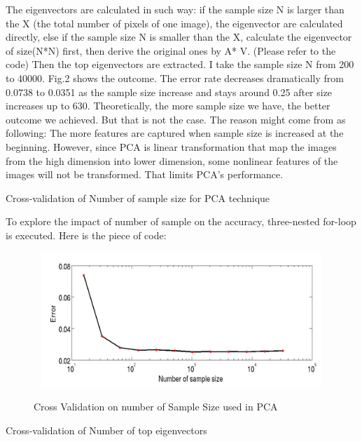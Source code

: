 \documentclass{article} %
\begin{document}
The eigenvectors are calculated in such way: if the sample size N is larger
than the X (the total number of pixels of one image), the eigenvector are
calculated directly, else if the sample size N is smaller than the X,
calculate the eigenvector of size(N*N) first, then derive the original ones by
A* V. (Please refer to the code) Then the top eigenvectors are extracted. I
take the sample size N from 200 to 40000. Fig.2 shows the outcome. The error
rate decreases dramatically  from 0.0738 to 0.0351 as the sample size increase
and stays around 0.25 after size increases up to 630.  Theoretically, the more
sample size we have, the better outcome we achieved. But that is not the case.
The reason might come from as following: The more features are captured when
sample size is increased at the beginning. However, since PCA is linear
transformation that map the images from the high dimension into lower
dimension, some nonlinear features of the images will not be transformed. That
limits PCA's performance.

Cross-validation of Number of sample size for PCA technique

To explore the impact of number of sample on the accuracy, three-nested
for-loop is executed.  Here is the piece of code:



\begin{figure}[h]
\begin{center}
    \includegraphics[width=5.5in,height=2in]{./images/sampleSize.png} \\
    \caption{Cross Validation on number of Sample Size used in PCA} 
\end{center}
\end{figure}

Cross-validation of Number of top eigenvectors
\end{document}
